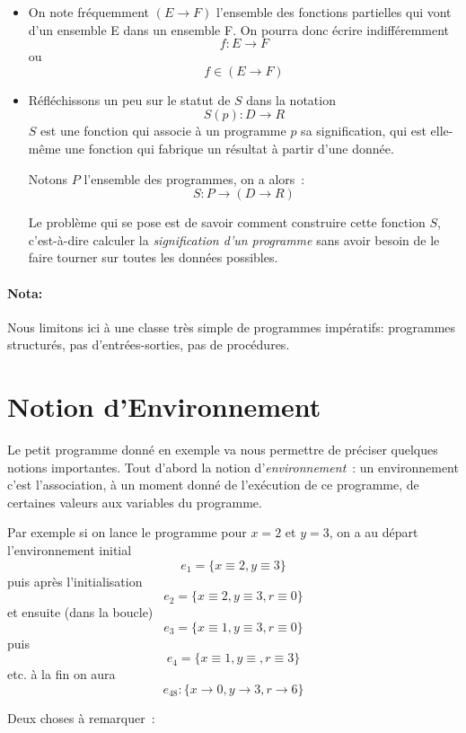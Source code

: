 \begin{itemize}
\item On note fréquemment $(E \rightarrow F)$ l'ensemble des fonctions
partielles qui vont d'un ensemble E dans un ensemble F. On pourra donc
écrire indifféremment $$f : E \rightarrow F$$  ou $$f \in  (E
\rightarrow F)$$

\item Réfléchissons un peu sur le statut de $S$ dans la notation 
$$S(p) : D \rightarrow R$$
$ S$ est une fonction qui associe à un programme $p$ sa
signification, qui est elle-m\^eme une fonction qui fabrique un
résultat à partir d'une donnée.

Notons $P$ l'ensemble des programmes, on a alors~:
          $$    S : P \rightarrow (D \rightarrow R)    $$

Le problème qui se pose est de
savoir comment construire cette fonction $S$, c'est-à-dire calculer la
\emph{signification d'un programme} sans avoir besoin de le faire tourner sur
toutes les données possibles. 
\end{itemize}

\paragraph{Nota:} Nous limitons ici à une classe très simple de programmes
impératifs: programmes structurés, pas d'entrées-sorties, pas de
procédures.


\section{Notion d'Environnement}

Le petit programme donné en exemple va nous permettre de préciser
quelques notions importantes. Tout d'abord la notion d'\emph{environnement}~:
un environnement c'est l'association, à un moment donné de l'exécution
de ce programme, de certaines valeurs aux variables du programme.

Par exemple si on lance le programme pour $x=2$ et $y=3$, on a au départ 
l'environnement initial      	$$e_1 = \{x \equiv 2 , y \equiv 3\}$$
puis après l'initialisation  $$e_2 = \{ x \equiv 2, y \equiv 3 , r \equiv 0\}$$
et ensuite (dans la boucle)  	$$e_3 = \{ x \equiv 1 , y \equiv 3 , r \equiv 0\}$$
puis $$e_4 = \{x \equiv 1 , y \equiv , r \equiv 3 \}$$
etc.
à la fin on aura   $$	e_{48} : \{ x \rightarrow 0 , y \rightarrow 3 , r \rightarrow 6 \}$$

Deux choses à remarquer~:

